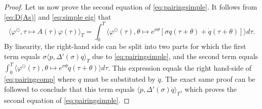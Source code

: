 \documentclass[english]{myarticle}
\begin{document}
\begin{sloppypar}
\begin{proposition}
\begin{proof}
Let us now prove the second equation of \eqref{eq:pairingsimple}. It follows from \eqref{eq:D(As)} and \eqref{eq:simple eig} that
\begin{equation*}
    \langle \varphi^\odot, \tau \mapsto A(\tau)\varphi(\tau) \rangle_T = \int_0^T \langle \varphi^\odot(\tau), \theta \mapsto e^{\sigma \theta}[\sigma q(\tau+\theta) + \dot{q}(\tau + \theta)] \rangle d\tau.
\end{equation*}
By linearity, the right-hand side can be split into two parts for which the first term equals $\sigma \langle p, \Delta'(\sigma) q \rangle_T$ due to \eqref{eq:pairingsimple}, and the second term equals $\int_0^T \langle \varphi^\odot(\tau), \theta \mapsto e^{\sigma \theta} \dot{q}(\tau + \theta) \rangle d\tau$. This expression equals the right hand-side of \eqref{eq:pairingcomp} where $q$ must be substituted by $\dot{q}$. The exact same proof can be followed to conclude that this term equals $\langle p,\Delta'(\sigma) \dot{q} \rangle_T$, which proves the second equation of \eqref{eq:pairingsimple}.
\end{proof}
\end{proposition}


\end{sloppypar}
\end{document}
